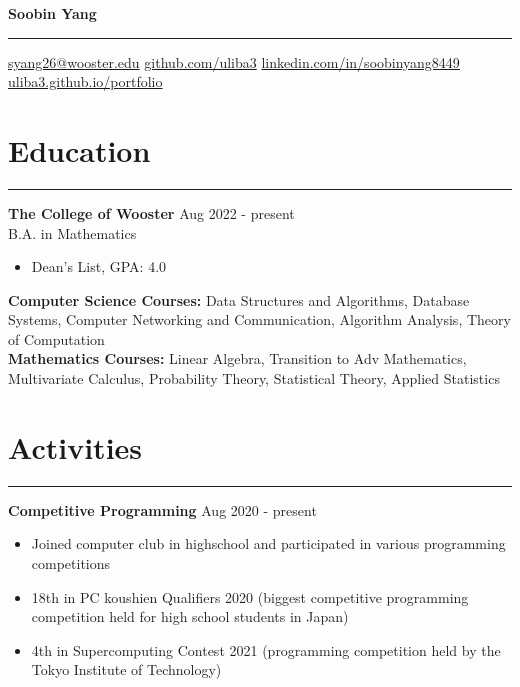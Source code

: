 \documentclass[a4paper,12pt]{article}
\begin{document}
\linespread{1}\selectfont
{}
\newcommand{\sectionrule}[1]{
  \vspace{-15pt}
  \section*{#1}
  \vspace{-5pt}
  \hrule
  \vspace{5pt}
}
\pagestyle{empty}

\begin{center}
    \textbf{\LARGE Soobin Yang}
    \vspace{5pt}
    \hrule
    \vspace{5pt}
    \faEnvelope \hspace{1pt} \href{mailto:syang26@wooster.edu}{syang26@wooster.edu} \hspace{5pt}
    \faGithubSquare \hspace{1pt} \href{https://github.com/uliba3}{github.com/uliba3} \hspace{5pt}
    \faLinkedinSquare \hspace{1pt} \href{https://linkedin.com/in/soobinyang8449}{linkedin.com/in/soobinyang8449} \\
    \faGlobe \hspace{1pt} \href{https://uliba3.github.io/portfolio/}{uliba3.github.io/portfolio}
\end{center}

\sectionrule{Education}
\textbf{The College of Wooster} \hfill \textnormal{Aug 2022 - present}\\
\textnormal{B.A. in Mathematics}
\begin{itemize}
    \item Dean's List, GPA: 4.0
\end{itemize}
\textbf{Computer Science Courses:} 
\textnormal{Data Structures and Algorithms, Database Systems, Computer Networking and Communication, Algorithm Analysis, Theory of Computation}\\
\textbf{Mathematics Courses:} 
\textnormal{Linear Algebra, Transition to Adv Mathematics, Multivariate Calculus, Probability Theory, Statistical Theory, Applied Statistics}

\sectionrule{Activities}
\textbf{Competitive Programming} \hfill \textnormal{Aug 2020 - present}
\begin{itemize}
    \item Joined computer club in highschool and participated in various programming competitions
    \item 18th in PC koushien Qualifiers 2020 (biggest competitive programming competition held for high school students in Japan)
    \item 4th in Supercomputing Contest 2021 (programming competition held by the Tokyo Institute of Technology)
\end{itemize}
\end{document}
